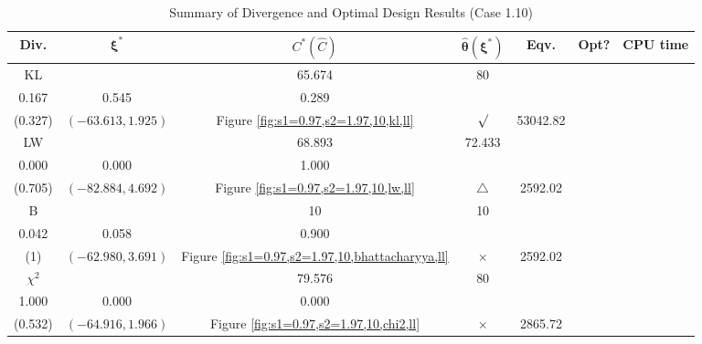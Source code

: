 \documentclass[12pt, a4paper]{article}
\begin{document}
\begin{table}[H]
\centering
\renewcommand{\arraystretch}{1.5} %
\setlength{\tabcolsep}{8pt} %
\begin{tabular}{|c|c|c|c|c|c|c|}
\hline
\textbf{Div.} & \(\boldsymbol{\xi^*}\) & \(C^* (\hat{C})\) & \(\boldsymbol{\hat{\theta}(\xi^*)}\) & \textbf{Eqv.} & \textbf{Opt?} & \textbf{CPU time} \\
\hline
KL & \(\left\{\begin{array}{ccc}
50.868 & 65.674 & 80 \\
0.167 & 0.545 & 0.289
\end{array}\right\}\) &
\(\begin{array}{c}
0.327 \\
(0.327)
\end{array}\) & 
\((-63.613, 1.925)\) & 
Figure \ref{fig:s1=0.97,s2=1.97,10,kl,ll} & $\surd$ & 53042.82 \\
\hline
LW & \(\left\{\begin{array}{ccc}
57.022 & 68.893 & 72.433 \\
0.000 & 0.000 & 1.000
\end{array}\right\}\) &
\(\begin{array}{c}
0.705 \\
(0.705)
\end{array}\) & 
\((-82.884, 4.692)\) & 
Figure \ref{fig:s1=0.97,s2=1.97,10,lw,ll} & $\triangle$ & 2592.02 \\
\hline
B & \(\left\{\begin{array}{ccc}
10 & 10 & 10 \\
0.042 & 0.058 & 0.900
\end{array}\right\}\) &
\(\begin{array}{c}
1 \\
(1)
\end{array}\) & 
\((-62.980, 3.691)\) & 
Figure \ref{fig:s1=0.97,s2=1.97,10,bhattacharyya,ll} & $\times$ & 2592.02 \\
\hline
\(\chi^2\) & \(\left\{\begin{array}{ccc}
61.641 & 79.576 & 80 \\
1.000 & 0.000 & 0.000
\end{array}\right\}\) &
\(\begin{array}{c}
0.532 \\
(0.532)
\end{array}\) & 
\((-64.916, 1.966)\) & 
Figure \ref{fig:s1=0.97,s2=1.97,10,chi2,ll} & $\times$ & 2865.72 \\
\hline
\end{tabular}
\caption{Summary of Divergence and Optimal Design Results (Case 1.10)}
\label{tab:results1.10}
\end{table}
\end{document}
